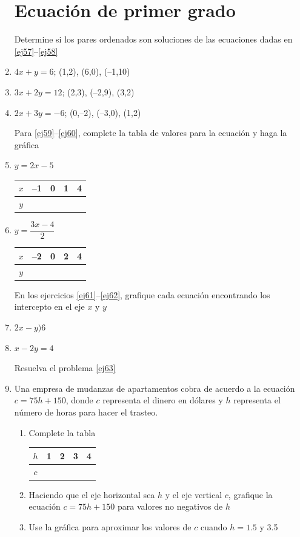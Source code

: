 \documentclass[twoside,letterpaper]{article}
\begin{document}
\begin{multicols}{2}
\begin{enumerate}
\section*{Ecuación de primer grado}
Determine si los pares ordenados son soluciones de las ecuaciones dadas en \ref{ej57}--\ref{ej58}
\item \label{ej57} $4x+y=6$; \quad (1,2), (6,0), (--1,10)
\item $3x+2y=12$; \quad (2,3), (--2,9), (3,2)
\item \label{ej58} $2x+3y=-6$; \quad (0,--2), (--3,0), (1,2)

Para \ref{ej59}--\ref{ej60}, complete la tabla de valores para la ecuación y haga la gráfica
\item \label{ej59} $y=2x-5$ 

\begin{tabular}{c|cccc}
\hline 
$x$ & --1 & 0 & 1 & 4 \\ 
\hline 
$y$ &  &  &  &  \\ 
\hline 
\end{tabular} 
\item \label{ej60} $y=\dfrac{3x-4}{2}$ 
\begin{center}
\begin{tabular}{c|cccc}
\hline 
$x$ & --2 & 0 & 2 & 4 \\ 
\hline 
$y$ &  &  &  &  \\ 
\hline 
\end{tabular} 
\end{center}

En los ejercicios \ref{ej61}--\ref{ej62}, grafique cada ecuación encontrando los intercepto en el eje $x$ y $y$
\item \label{ej61} $2x-y)6$
\item \label{ej62} $x-2y=4$

Resuelva el problema \ref{ej63}
\item \label{ej63} Una empresa de mudanzas de apartamentos cobra de acuerdo a la ecuación $c=75h+150$, donde $c$ representa el dinero en dólares y $h$ representa el número de horas para hacer el trasteo. 
\begin{enumerate}
\item Complete la tabla

\begin{center}
 \begin{tabular}{c|cccc}
\hline 
$h$ & 1 & 2 & 3 & 4 \\ 
\hline 
$c$ &  &  &  &  \\ 
\hline 
\end{tabular}
 \end{center} 
\item Haciendo que el eje horizontal sea $h$ y el eje vertical $c$, grafique la ecuación $c=75h+150$ para valores no negativos de $h$
\item Use la gráfica para aproximar los valores de $c$ cuando $h=1.5$ y 3.5
\end{enumerate}

\end{enumerate}
\end{multicols}
\end{document}
